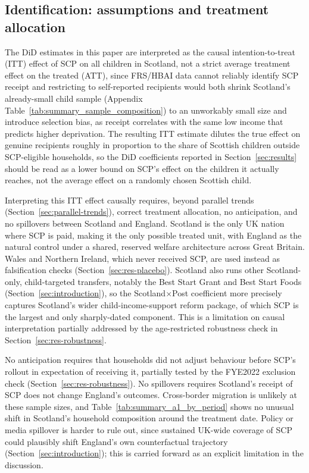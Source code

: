 \subsection{Identification: assumptions and treatment allocation}
\label{sec:identification-assumptions}
 
The DiD estimates in this paper are interpreted as the causal intention-to-treat (ITT) effect of SCP on all children in Scotland, not a strict average treatment effect on the treated (ATT), since FRS/HBAI data cannot reliably identify SCP receipt and restricting to self-reported recipients would both shrink Scotland's already-small child sample (Appendix Table~\ref{tab:summary_sample_composition}) to an unworkably small size and introduce selection bias, as receipt correlates with the same low income that predicts higher deprivation. The resulting ITT estimate dilutes the true effect on genuine recipients roughly in proportion to the share of Scottish children outside SCP-eligible households, so the DiD coefficients reported in Section~\ref{sec:results} should be read as a lower bound on SCP's effect on the children it actually reaches, not the average effect on a randomly chosen Scottish child.

Interpreting this ITT effect causally requires, beyond parallel trends (Section~\ref{sec:parallel-trends}), correct treatment allocation, no anticipation, and no spillovers between Scotland and England. Scotland is the only UK nation where SCP is paid, making it the only possible treated unit, with England as the natural control under a shared, reserved welfare architecture across Great Britain. Wales and Northern Ireland, which never received SCP, are used instead as falsification checks (Section~\ref{sec:res-placebo}). Scotland also runs other Scotland-only, child-targeted transfers, notably the Best Start Grant and Best Start Foods (Section~\ref{sec:introduction}), so the Scotland$\times$Post coefficient more precisely captures Scotland's wider child-income-support reform package, of which SCP is the largest and only sharply-dated component. This is a limitation on causal interpretation partially addressed by the age-restricted robustness check in Section~\ref{sec:res-robustness}.

No anticipation requires that households did not adjust behaviour before SCP's rollout in expectation of receiving it, partially tested by the FYE2022 exclusion check (Section~\ref{sec:res-robustness}). No spillovers requires Scotland's receipt of SCP does not change England's outcomes. Cross-border migration is unlikely at these sample sizes, and Table~\ref{tab:summary_a1_by_period} shows no unusual shift in Scotland's household composition around the treatment date. Policy or media spillover is harder to rule out, since sustained UK-wide coverage of SCP could plausibly shift England's own counterfactual trajectory (Section~\ref{sec:introduction}); this is carried forward as an explicit limitation in the discussion.

